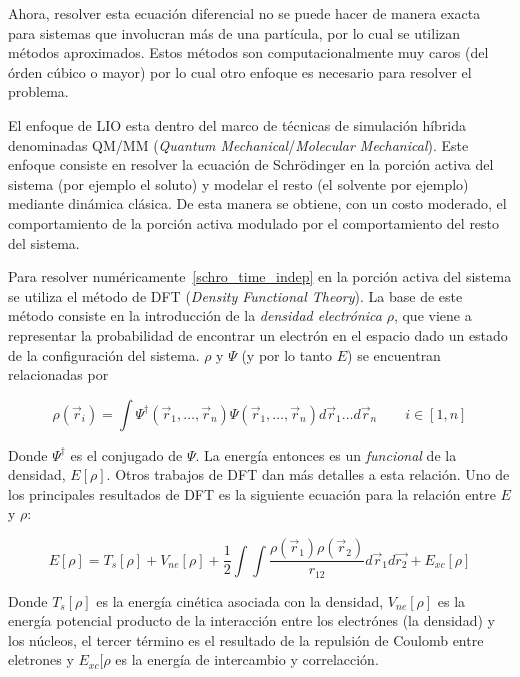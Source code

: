 Ahora, resolver esta ecuaci\'on diferencial no se puede hacer de manera exacta para sistemas que involucran m\'as
de una part\'icula, por lo cual se utilizan m\'etodos aproximados. Estos m\'etodos son computacionalmente muy caros
(del \'orden c\'ubico o mayor) por lo cual otro enfoque es necesario para resolver el problema.

El enfoque de LIO esta dentro del marco de t\'ecnicas de simulaci\'on h\'ibrida denominadas QM/MM 
(\textit{Quantum Mechanical}/\textit{Molecular Mechanical}). Este enfoque consiste en resolver la ecuaci\'on de
Schr\"odinger en la porci\'on activa del sistema (por ejemplo el soluto) y modelar el resto (el solvente por
ejemplo) mediante din\'amica cl\'asica. De esta manera se obtiene, con un costo moderado, el comportamiento de
la porci\'on activa modulado por el comportamiento del resto del sistema.

Para resolver num\'ericamente~\ref{schro_time_indep} en la porci\'on activa del sistema se utiliza el m\'etodo
de DFT (\textit{Density Functional Theory}). La base de este m\'etodo consiste en la introducci\'on de la
\textit{densidad electr\'onica} $\rho$, que viene a representar la probabilidad de encontrar un electr\'on en
el espacio dado un estado de la configuraci\'on del sistema. $\rho$ y $\Psi$ (y por lo tanto $E$) se encuentran relacionadas por

\begin{equation}
    \label{honenberg_kohn}
    \rho(\vec{r}_i) = \int \Psi^{\dagger}(\vec{r}_1, \dots, \vec{r}_n) \Psi(\vec{r}_1, \dots, \vec{r}_n) d\vec{r}_1 \dots d\vec{r}_n \qquad i \in [1,n]
\end{equation}

Donde $\Psi^{\dagger}$ es el conjugado de $\Psi$. La energ\'ia entonces es un \textit{funcional} de la densidad, $E[\rho]$. Otros trabajos de DFT dan m\'as
detalles a esta relaci\'on. Uno de los principales resultados de DFT es la siguiente ecuaci\'on para la relaci\'on entre $E$ y $\rho$:

\begin{equation}
    \label{honenberg_kohn} 
    E[\rho] = T_s[\rho] + V_{ne}[\rho] + \frac{1}{2} \int \int \frac{\rho(\vec{r}_1) \rho(\vec{r}_2)}{r_{12}} d\vec{r}_1 d\vec{r_2} + E_{xc}[\rho]
\end{equation}

Donde $T_s[\rho]$ es la energ\'ia cin\'etica asociada con la densidad, $V_{ne}[\rho]$ es la energ\'ia potencial producto de la interacci\'on entre los
electr\'ones (la densidad) y los n\'ucleos, el tercer t\'ermino es el resultado de la repulsi\'on de Coulomb entre eletrones y $E_{xc}[\rho$ es la
energ\'ia de intercambio y correlacci\'on.

